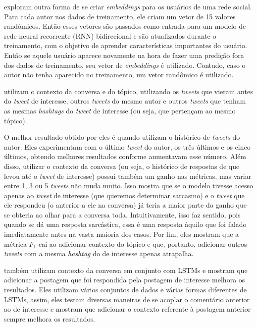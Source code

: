 \cite{kolchinski-potts:2018:representing-social-media-users} exploram outra
forma de se criar \textit{embeddings} para os usuários de uma rede social. Para
cada autor nos dados de treinamento, ele criam um vetor de 15 valores
randômicos. Então esses vetores são passados como entrada para um modelo de rede
neural recorrente (RNN) bidirecional e são atualizados durante o treinamento,
com o objetivo de aprender características importantes do usuário. Então se
aquele usuário aparece novamente na hora de fazer uma predição fora dos dados de
treinamento, seu vetor de \textit{embeddings} é utilizado. Contudo, caso o autor
não tenha aparecido no treinamento, um vetor randômico é utilizado.

\cite{wang-etal:2015:context-twitter} utilizam o contexto da conversa e do
tópico, utilizando os \textit{tweets} que vieram antes do \textit{tweet} de
interesse, outros \textit{tweets} do mesmo autor e outros \textit{tweets} que
tenham as mesmas \textit{hashtags} do \textit{tweet} de interesse (ou seja, que
pertençam ao mesmo tópico).

O melhor resultado obtido por eles é quando utilizam o histórico de
\textit{tweets} do autor. Eles experimentam com o último \textit{tweet} do
autor, os três últimos e os cinco últimos, obtendo melhores resultados conforme
aumentavam esse número. Além disso, utilizar o contexto da conversa (ou seja, o
histórico de respostas de que levou até o \textit{tweet} de interesse) possui
também um ganho nas métricas, mas variar entre 1, 3 ou 5 \textit{tweets} não
muda muito. Isso mostra que se o modelo tivesse acesso apenas ao \textit{tweet}
de interesse (que queremos determinar sarcasmo) e o \textit{tweet} que ele
respondeu (o anterior a ele na conversa) já teria a maior parte do ganho que
se obteria ao olhar para a conversa toda. Intuitivamente, isso faz sentido, pois
quando se dá uma resposta sarcástica, essa é uma resposta àquilo que foi falado
imediatamente antes na vasta maioria dos casos. Por fim, eles mostram que a
métrica $F_1$ cai ao adicionar contexto do tópico e que, portanto, adicionar
outros \textit{tweets} com a mesma \textit{hashtag} do de interesse apenas
atrapalha.

\cite{ghosh:2018:sarcasm-conversation-context} também utilizam contexto da
conversa em conjunto com LSTMs e mostram que adicionar a postagem que foi
respondida pela postagem de interesse melhora os resultados. Eles utilizam
vários conjuntos de dados e várias formas diferentes de LSTMs, assim, eles
testam diversas maneiras de se acoplar o comentário anterior ao de interesse e
mostram que adicionar o contexto referente à postagem anterior sempre melhora os
resultados.

